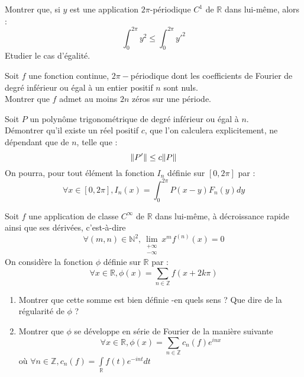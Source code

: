 
\begin{exer}
Montrer que, si $y$ est une application $2 \pi$-périodique $C^1$ de $\mathbb{R}$ dans lui-même, alors :
\[\int_{0}^{2 \pi} y^2 \leq \int_{0}^{2 \pi} y'^2\]
Etudier le cas d'égalité.
\end{exer}

\begin{exer}
Soit $f$ une fonction continue, $2\pi-$périodique dont les coefficients de Fourier %
de degré inférieur ou égal à un entier positif $n$ sont nuls.\\
Montrer que $f$ admet au moins $2n$ zéros sur une période.
\end{exer}

\begin{exer}
Soit $P$ un polynôme trigonométrique de degré inférieur ou égal à $n$.\\
Démontrer qu'il existe un réel positif $c$, que l'on calculera explicitement, ne dépendant que de $n$, telle que :
\[\Arrowvert P' \Arrowvert \leq c \Arrowvert P \Arrowvert\]
On pourra, pour tout élément la fonction $I_n$ définie sur $[0,2\pi]$ par :
\[\forall x \in [0,2\pi], I_n(x) = \int_0^{2\pi} P(x-y)F_n(y) dy\]
\end{exer}

\begin{exer}
Soit $f$ une application de classe $C^{\infty}$ de $\mathbb{R}$ dans lui-même, à décroissance rapide ainsi que ses dérivées, c'est-à-dire 
\[\forall (m,n) \in \mathbb{N}^2 , \lim\limits_{\substack{+ \infty \\ - \infty}} x^m f^{(n)}(x) = 0\]
On considère la fonction $\phi$ définie sur $\mathbb{R}$ par :\[\forall x \in \mathbb{R} , \phi (x) = \sum\limits_{n \in \mathbb{Z}} f(x+2k\pi)\]
\begin{enumerate}
\item Montrer que cette somme est bien définie -en quels sens ? Que dire de la régularité de $\phi$ ?
\item Montrer que $\phi$ se développe en série de Fourier de la manière suivante
\[\forall x \in \mathbb{R} , \phi (x) = \sum\limits_{n \in \mathbb{Z}} c_n(f) e^{inx}\]
où $\forall n \in \mathbb{Z} , c_n(f) = \int\limits_{\mathbb{R}} f(t) e^{-int} dt$
\end{enumerate}
\end{exer}

